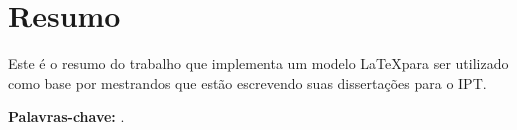 \section*{Resumo}

\noindent Este é o resumo do trabalho que implementa um modelo \LaTeX para ser utilizado como base por mestrandos que estão escrevendo suas dissertações para o IPT.

\bigskip

\noindent\textbf{Palavras-chave:} \thskeywords.
\pagebreak
